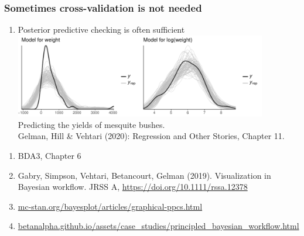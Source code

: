 \documentclass[10pt]{beamer}
\begin{document}
\begin{frame}

\frametitle{ Sometimes cross-validation is not needed}

\vspace{-0.5\baselineskip}

  \begin{enumerate}
  \item<2-> Posterior predictive checking is often sufficient\\
    \vspace{0.5\baselineskip}
    \includegraphics[width=11cm]{figs/mesquite_ppc.pdf}\\
  \vspace{-0.1\baselineskip} {Predicting the yields of mesquite bushes.\\
    \color{gray} \footnotesize
    Gelman, Hill \& Vehtari (2020): Regression and Other Stories, Chapter 11.}\\
  \vspace{-0.8\baselineskip}
\end{enumerate}
{\footnotesize
  \begin{enumerate}
  \item<3-> BDA3, Chapter 6
  \vspace{-0.6\parskip}
  \item<3-> Gabry, Simpson, Vehtari, Betancourt, Gelman
    (2019). Visualization in Bayesian workflow. JRSS A, \url{https://doi.org/10.1111/rssa.12378}
  \vspace{-0.6\parskip}
  \item<3-> \url{mc-stan.org/bayesplot/articles/graphical-ppcs.html}
  \vspace{-0.6\parskip}
  \item<3-> \url{betanalpha.github.io/assets/case_studies/principled_bayesian_workflow.html}
   \end{enumerate}}
\end{frame}
\end{document}
